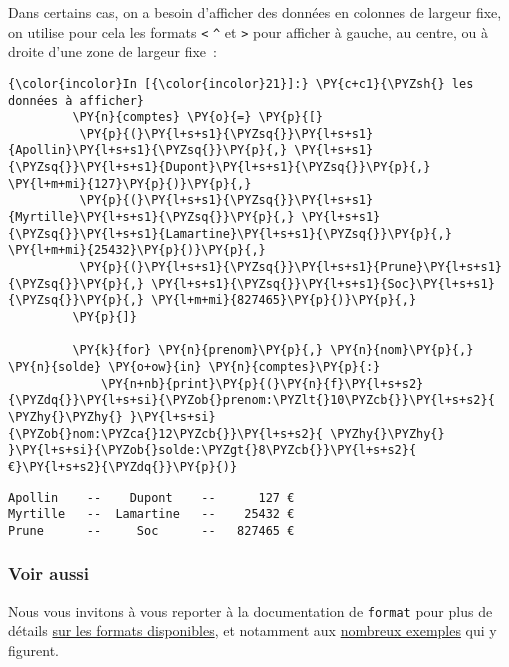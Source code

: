     Dans certains cas, on a besoin d'afficher des données en colonnes de
largeur fixe, on utilise pour cela les formats \texttt{\textless{}}
\texttt{\^{}} et \texttt{\textgreater{}} pour afficher à gauche, au
centre, ou à droite d'une zone de largeur fixe~:

    \begin{Verbatim}[commandchars=\\\{\},frame=single,framerule=0.3mm,rulecolor=\color{cellframecolor}]
{\color{incolor}In [{\color{incolor}21}]:} \PY{c+c1}{\PYZsh{} les données à afficher}
         \PY{n}{comptes} \PY{o}{=} \PY{p}{[}
          \PY{p}{(}\PY{l+s+s1}{\PYZsq{}}\PY{l+s+s1}{Apollin}\PY{l+s+s1}{\PYZsq{}}\PY{p}{,} \PY{l+s+s1}{\PYZsq{}}\PY{l+s+s1}{Dupont}\PY{l+s+s1}{\PYZsq{}}\PY{p}{,} \PY{l+m+mi}{127}\PY{p}{)}\PY{p}{,}
          \PY{p}{(}\PY{l+s+s1}{\PYZsq{}}\PY{l+s+s1}{Myrtille}\PY{l+s+s1}{\PYZsq{}}\PY{p}{,} \PY{l+s+s1}{\PYZsq{}}\PY{l+s+s1}{Lamartine}\PY{l+s+s1}{\PYZsq{}}\PY{p}{,} \PY{l+m+mi}{25432}\PY{p}{)}\PY{p}{,}
          \PY{p}{(}\PY{l+s+s1}{\PYZsq{}}\PY{l+s+s1}{Prune}\PY{l+s+s1}{\PYZsq{}}\PY{p}{,} \PY{l+s+s1}{\PYZsq{}}\PY{l+s+s1}{Soc}\PY{l+s+s1}{\PYZsq{}}\PY{p}{,} \PY{l+m+mi}{827465}\PY{p}{)}\PY{p}{,}
         \PY{p}{]}
         
         \PY{k}{for} \PY{n}{prenom}\PY{p}{,} \PY{n}{nom}\PY{p}{,} \PY{n}{solde} \PY{o+ow}{in} \PY{n}{comptes}\PY{p}{:}
             \PY{n+nb}{print}\PY{p}{(}\PY{n}{f}\PY{l+s+s2}{\PYZdq{}}\PY{l+s+si}{\PYZob{}prenom:\PYZlt{}10\PYZcb{}}\PY{l+s+s2}{ \PYZhy{}\PYZhy{} }\PY{l+s+si}{\PYZob{}nom:\PYZca{}12\PYZcb{}}\PY{l+s+s2}{ \PYZhy{}\PYZhy{} }\PY{l+s+si}{\PYZob{}solde:\PYZgt{}8\PYZcb{}}\PY{l+s+s2}{ €}\PY{l+s+s2}{\PYZdq{}}\PY{p}{)}
\end{Verbatim}


    \begin{Verbatim}[commandchars=\\\{\},frame=single,framerule=0.3mm,rulecolor=\color{cellframecolor}]
Apollin    --    Dupont    --      127 €
Myrtille   --  Lamartine   --    25432 €
Prune      --     Soc      --   827465 €
\end{Verbatim}

    \hypertarget{voir-aussi}{%
\subsubsection{Voir aussi}\label{voir-aussi}}

    Nous vous invitons à vous reporter à la documentation de \texttt{format}
pour plus de détails
\href{https://docs.python.org/3/library/string.html\#formatstrings}{sur
les formats disponibles}, et notamment aux
\href{https://docs.python.org/3/library/string.html\#format-examples}{nombreux
exemples} qui y figurent.


    
    
    
